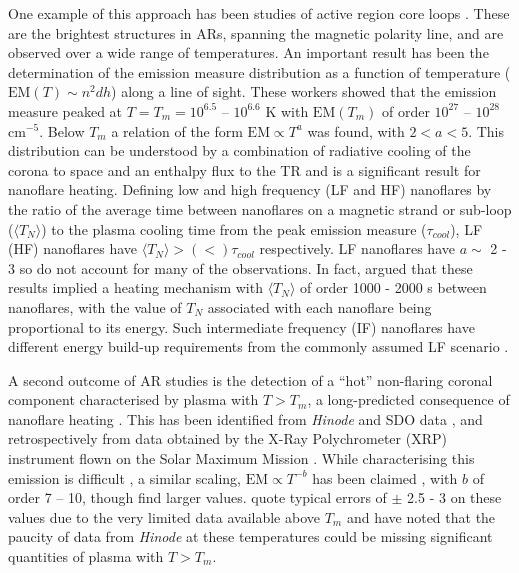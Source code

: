 \documentclass[apj]{emulateapj}
\begin{document}
	\par One example of this approach has been studies of active region core loops \citep{warren_constraints_2011,warren_systematic_2012,winebarger_using_2011,tripathi_emission_2011,schmelz_cold_2012,bradshaw_diagnosing_2012,reep_diagnosing_2013,del_zanna_elemental_2014}. These are the brightest structures in ARs, spanning the magnetic polarity line, and are observed over a wide range of temperatures. An important result has been the determination of the emission measure distribution as a function of temperature ($\mathrm{EM}(T)\sim n^2dh$) along a line of sight. These workers showed that the emission measure peaked at $T = T_m = 10^{6.5}$ – $10^{6.6}$ K with $\mathrm{EM}(T_m)$ of order $10^{27}$ – $10^{28}$ cm$^{-5}$.  Below $T_m$ a relation of the form $\mathrm{EM} \propto T^a$ was found, with $2 < a < 5$. This distribution can be understood by a combination of radiative cooling of the corona to space and an enthalpy flux to the TR \citep[e.g.][]{bradshaw_new_2010,bradshaw_cooling_2010} and is a significant result for nanoflare heating. Defining low and high frequency (LF and HF) nanoflares by the ratio of the average time between nanoflares on a magnetic strand or sub-loop ($\langle T_N \rangle$) to the plasma cooling time from the peak emission measure ($\tau_{cool}$), LF (HF) nanoflares have $\langle T_N \rangle > (<) \tau_{cool}$ respectively. LF nanoflares have $a \sim$ 2 - 3 so do not account for many of the observations. In fact, \citet{cargill_active_2014} argued that these results implied a heating mechanism with $\langle T_N \rangle$ of order 1000 - 2000 s between nanoflares, with the value of $T_N$ associated with each nanoflare being proportional to its energy. Such intermediate frequency (IF) nanoflares have different energy build-up requirements from the commonly assumed LF scenario \citep{cargill_active_2014}.  
%
	\par A second outcome of AR studies is the detection of a ``hot'' non-flaring coronal component characterised by plasma with $T > T_m$, a long-predicted consequence of nanoflare heating \citep{cargill_implications_1994,cargill_diagnostics_1995}. This has been identified from \textit{Hinode} and SDO data \citep{testa_hinode/eis_2012,reale_evidence_2009}, and retrospectively from data obtained by the X-Ray Polychrometer (XRP) instrument flown on the Solar Maximum Mission \citep{del_zanna_elemental_2014}. While characterising this emission is difficult \citep[e.g.][]{winebarger_defining_2012}, a similar scaling, $\mathrm{EM} \propto T^{-b}$ has been claimed \citep[e.g.][]{warren_systematic_2012}, with $b$ of order 7 – 10, though \citet{del_zanna_elemental_2014} find larger values. \citeauthor{warren_systematic_2012} quote typical errors of $\pm$ 2.5 - 3 on these values due to the very limited data available above $T_m$ and \citeauthor{winebarger_defining_2012} have noted that the paucity of data from \textit{Hinode} at these temperatures could be missing significant quantities of plasma with $T > T_m$. 
\end{document}
